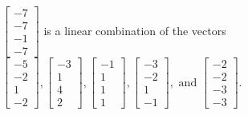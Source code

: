 \begin{exercise}
\begin{exerciseStatement}
  \end{exerciseStatement}
  \begin{exerciseAnswer}
   \(\left[\begin{array}{c}
-7 \\
-7 \\
-1 \\
-7
\end{array}\right]\) 
  	 is  
	a linear combination of the vectors \(\left[\begin{array}{c}
-5 \\
-2 \\
1 \\
-2
\end{array}\right] , \left[\begin{array}{c}
-3 \\
1 \\
4 \\
2
\end{array}\right] , \left[\begin{array}{c}
-1 \\
1 \\
1 \\
1
\end{array}\right] , \left[\begin{array}{c}
-3 \\
-2 \\
1 \\
-1
\end{array}\right] , \text{ and } \left[\begin{array}{c}
-2 \\
-2 \\
-3 \\
-3
\end{array}\right]\).

	
  


  \end{exerciseAnswer}
\end{exercise}